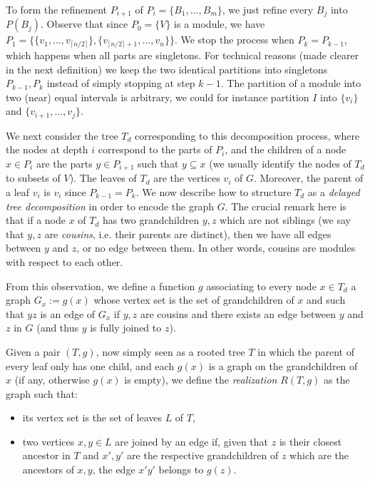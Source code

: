  To form the refinement $P_{i+1}$ of $P_i=\{B_1, \ldots, B_m\}$, we just refine every $B_j$ into $P(B_j)$. Observe that since $P_0=\{V\}$ is a module, we have $P_1 = \{\{v_1, \ldots, v_{\lceil n/2 \rceil}\}, \{v_{\lceil n/2 \rceil + 1}, \ldots, v_n\}\}$. We stop the process when $P_k=P_{k-1}$, which happens when all parts are singletons. For technical reasons (made clearer in the next definition) we keep the two identical partitions into singletons $P_{k-1},P_k$ instead of simply stopping at step $k-1$. The partition of a module into two (near) equal intervals is arbitrary, we could for instance partition $I$ into $\{v_i\}$ and $\{v_{i+1},\dots, v_j\}$.
 
We next consider the tree $T_d$ corresponding to this decomposition process, where the nodes at depth $i$ correspond to the parts of $P_i$, and the children of a node $x\in P_i$ are the parts $y\in P_{i+1}$ such that $y\subseteq x$ (we usually identify the nodes of $T_d$ to subsets of $V$). The leaves of $T_d$ are the vertices $v_i$ of $G$. Moreover, the parent of a leaf $v_i$ is $v_i$ since $P_{k-1}=P_k$. We now describe how to structure $T_d$ as a \emph{delayed tree decomposition} in order to encode the graph $G$. The crucial remark here is that if a node $x$ of $T_d$ has two grandchildren $y,z$ which are not siblings (we say that $y,z$ are \emph{cousins}, i.e. their parents are distinct), then we have all edges between $y$ and $z$, or no edge between them. In other words, cousins are modules with respect to each other.

From this observation, we define a function $g$ associating to every node $x\in T_d$ a graph $G_x:=g(x)$ whose vertex set is the set of  grandchildren of $x$ and such that $yz$ is an edge of $G_x$ if $y,z$ are cousins and there exists an edge between $y$ and $z$ in $G$ (and thus $y$ is fully joined to $z$). 

Given a pair $(T,g)$, now simply seen as a rooted tree $T$ in which the parent of every leaf only has one child, and each $g(x)$ is a graph on the grandchildren of $x$ (if any, otherwise $g(x)$ is empty), we define the \emph{realization} $R(T,g)$ as the graph such that: 
\begin{itemize}
    \item its vertex set is the set of leaves $L$ of $T$,
    \item two vertices $x,y\in L$ are joined by an edge if, given that $z$ is their closest ancestor in $T$ and $x',y'$ are the respective grandchildren of $z$ which are the ancestors of $x,y$, the edge $x'y'$ belongs to $g(z)$.
\end{itemize}

